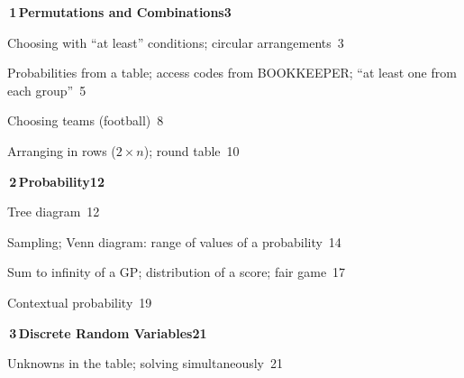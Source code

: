 \documentclass[a4paper,openany]{book}
\begin{document}
{\small\linespread{0.92}\selectfont
\medskip\noindent\colorbox{blue!8}{\parbox{\dimexpr\textwidth-2\fboxsep}{\large\bfseries\color{blue!50!black}\colorbox{blue!50!black}{\color{white}\,1\,}\quad Permutations and Combinations\hfill 3}}\par\nopagebreak\smallskip\nopagebreak
\noindent{}\quad Choosing with ``at least'' conditions; circular arrangements\dotfill\ 3\par
\noindent{}\quad Probabilities from a table; access codes from BOOKKEEPER; ``at least one from each group''\dotfill\ 5\par
\noindent{}\quad Choosing teams (football)\dotfill\ 8\par
\noindent{}\quad Arranging in rows ($2\times n$); round table\dotfill\ 10\par
\medskip\noindent\colorbox{blue!8}{\parbox{\dimexpr\textwidth-2\fboxsep}{\large\bfseries\color{blue!50!black}\colorbox{blue!50!black}{\color{white}\,2\,}\quad Probability\hfill 12}}\par\nopagebreak\smallskip\nopagebreak
\noindent{}\quad Tree diagram\dotfill\ 12\par
\noindent{}\quad Sampling; Venn diagram: range of values of a probability\dotfill\ 14\par
\noindent{}\quad Sum to infinity of a GP; distribution of a score; fair game\dotfill\ 17\par
\noindent{}\quad Contextual probability\dotfill\ 19\par
\medskip\noindent\colorbox{blue!8}{\parbox{\dimexpr\textwidth-2\fboxsep}{\large\bfseries\color{blue!50!black}\colorbox{blue!50!black}{\color{white}\,3\,}\quad Discrete Random Variables\hfill 21}}\par\nopagebreak\smallskip\nopagebreak
\noindent{}\quad Unknowns in the table; solving simultaneously\dotfill\ 21\par
}
\end{document}
